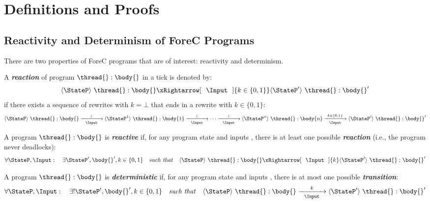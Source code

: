 \section{Definitions and Proofs}
\label{sec:proofs}

\subsection{Reactivity and Determinism of ForeC Programs}
There are two properties of ForeC programs that are of interest:
reactivity and determinism.

\begin{definition}
	\label{def:reaction}
	A \emph{\textbf{reaction}} of program $\thread{}:\body{}$ in a tick is 
	denoted by:
	\begin{equation*}
		\langle \StateP \rangle ~ \thread{}:\body{} 
			\xRightarrow[~~\Input~~]{k \in \{0, 1\}} 
		\langle \StateP' \rangle ~ \thread{}:\body{}'
	\end{equation*}
	if there exists a sequence of rewrites with $k = \bot$
	that ends in a rewrite with $k \in \{0, 1\}$:
	\begin{equation*}
		\langle \StateP \rangle ~ \thread{}:\body{} 
			\xrightarrow[~~\Input~~]{\bot}
		\langle \StateP^1 \rangle ~ \thread{}:\body{1}
			\xrightarrow[~~\Input~~]{\bot}
			\dotsb
			\xrightarrow[~~\Input~~]{\bot}
		\langle \StateP^n \rangle ~ \thread{}:\body{n}
			\xrightarrow[~~\Input~~]{k \in \{0, 1\}} 
		\langle \StateP' \rangle ~ \thread{}:\body{}'
	\end{equation*}
\end{definition}

\begin{definition}
	\label{def:reactive}
	A program $\thread{}:\body{}$ is \emph{\textbf{reactive}} if, for 
	any program state \StateP{} and inputs \Input{}, 
	there is at least one possible \emph{\textbf{reaction}}
	(i.e., the program never deadlocks):
	\begin{equation*}
		\forall \StateP, \Input:
		\quad
		\exists \StateP', \body{}', k \in \{0, 1\}
		\quad
		\text{\emph{such that}}
		\quad
		\langle \StateP \rangle ~ \thread{}:\body{} 
			\xRightarrow[~~\Input~~]{k} 
		\langle \StateP' \rangle ~ \thread{}:\body{}'
	\end{equation*}
\end{definition}

\begin{definition}
	\label{def:deterministic}
	A program $\thread{}:\body{}$ is \emph{\textbf{deterministic}} if, for 
	any program state \StateP{}	and inputs \Input{}, there is at most one 
	possible \emph{\textbf{transition}}:
	\begin{equation*}
		\forall \StateP, \Input:
		\quad
		\exists ! \StateP', \body{}', k \in \{0, 1\}
		\quad
		\text{\emph{such that}}
		\quad
		\langle \StateP \rangle ~ \thread{}:\body{} 
			\xrightarrow[~~\Input~~]{k} 
		\langle \StateP' \rangle ~ \thread{}:\body{}'
	\end{equation*}
\end{definition}


